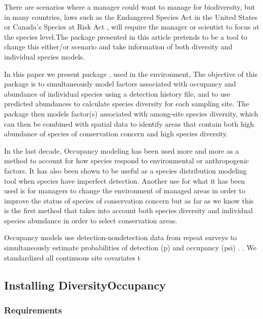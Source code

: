 \documentclass[article]{jss}
\begin{document}
There are scenarios where a manager could want to manage for
biodiversity, but in many countries, laws such as the Endangered Species
Act in the United States or Canada's Species at Risk Act
\citep{congress1973endangered, waples2013tale}, will require the manager
or scientist to focus at the species level.The package presented in this
article pretends to be a tool to change this either/or scenario and take
information of both diversity and individual species models.

In this paper we present package , used in the
 environment, The objective of this package is to
simultaneously model factors associated with occupancy and abundance of
individual species using a detection history file, and to use predicted
abundances to calculate species diversity for each sampling site. The
package then models factor(s) associated with among-site species
diversity, which can then be combined with spatial data to identify
areas that contain both high abundance of species of conservation
concern and high species diversity.

In the last decade, Occupancy modeling has been used more and more as a
method to account for how species respond to environmental or
anthropogenic factors. It has also been shown to be useful as a species
distribution modeling tool when species have imperfect detection.
Another use for what it has been used is for managers to change the
environment of managed areas in order to improve the status of species
of conservation concern
\citep{mackenzie_estimating_2002, mackenzie2006occupancy} but as far as
we know this is the first method that takes into account both species
diversity and individual species abundance in order to select
conservation areas.

Occupancy models use detection-nondetection data from repeat surveys to
simultaneously estimate probabilities of detection (p) and occupancy
(psi) \citep{mackenzie2006occupancy}. \citep{burnham2003model}. We
standardized all continuous site covariates t

\subsection{Installing
DiversityOccupancy}\label{installing-diversityoccupancy}

\subsubsection{Requirements}\label{requirements}
\end{document}
